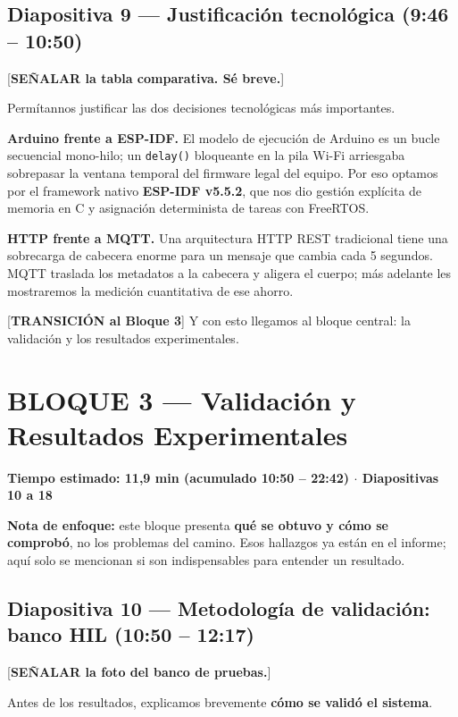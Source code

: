 \documentclass[11pt, a4paper]{article}
\begin{document}
\subsection*{Diapositiva 9 — Justificación tecnológica (9:46 – 10:50)}

[\textbf{SEÑALAR la tabla comparativa. Sé breve.}]

Permítannos justificar las dos decisiones tecnológicas más importantes.

\textbf{Arduino frente a ESP-IDF.} El modelo de ejecución de Arduino es un bucle secuencial mono-hilo; un \texttt{delay()} bloqueante en la pila Wi-Fi arriesgaba sobrepasar la ventana temporal del firmware legal del equipo. Por eso optamos por el framework nativo \textbf{ESP-IDF v5.5.2}, que nos dio gestión explícita de memoria en C y asignación determinista de tareas con FreeRTOS.

\textbf{HTTP frente a MQTT.} Una arquitectura HTTP REST tradicional tiene una sobrecarga de cabecera enorme para un mensaje que cambia cada 5 segundos. MQTT traslada los metadatos a la cabecera y aligera el cuerpo; más adelante les mostraremos la medición cuantitativa de ese ahorro.

[\textbf{TRANSICIÓN al Bloque 3}] Y con esto llegamos al bloque central: la validación y los resultados experimentales.

\hrulefill

\section*{BLOQUE 3 — Validación y Resultados Experimentales}
\textbf{Tiempo estimado: 11,9 min (acumulado 10:50 – 22:42) $\cdot$ Diapositivas 10 a 18}

\begin{guionquote}
\textbf{Nota de enfoque:} este bloque presenta \textbf{qué se obtuvo y cómo se comprobó}, no los problemas del camino. Esos hallazgos ya están en el informe; aquí solo se mencionan si son indispensables para entender un resultado.
\end{guionquote}

\subsection*{Diapositiva 10 — Metodología de validación: banco HIL (10:50 – 12:17)}

[\textbf{SEÑALAR la foto del banco de pruebas.}]

Antes de los resultados, explicamos brevemente \textbf{cómo se validó el sistema}.
\end{document}
